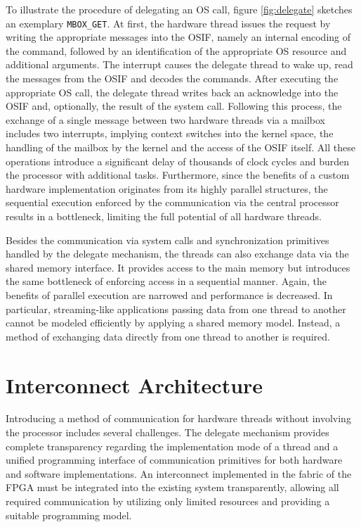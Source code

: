 To illustrate the procedure of delegating an \ac{OS} call, figure
\ref{fig:delegate} sketches an exemplary \lstinline{MBOX_GET}. At first, the
hardware thread issues the request by writing the appropriate messages into
the \ac{OSIF}, namely an internal encoding of the command, followed by an
identification of the appropriate \ac{OS} resource and additional arguments.
The interrupt causes the delegate thread to wake up, read the messages from
the \ac{OSIF} and decodes the commands. After executing the appropriate
\ac{OS} call, the delegate thread writes back an acknowledge into the
\ac{OSIF} and, optionally, the result of the system call. Following this
process, the exchange of a single message between two hardware threads via a
mailbox includes two interrupts, implying context switches into the kernel
space, the handling of the mailbox by the kernel and the access of the
\ac{OSIF} itself. All these operations introduce a significant delay of
thousands of clock cycles and burden the processor with additional tasks.
Furthermore, since the benefits of a custom hardware implementation originates
from its highly parallel structures, the sequential execution enforced by the
communication via the central processor results in a bottleneck, limiting the
full potential of all hardware threads.

Besides the communication via system calls and synchronization primitives
handled by the delegate mechanism, the threads can also exchange data via the
shared memory interface. It provides access to the main memory but introduces
the same bottleneck of enforcing access in a sequential manner. Again, the
benefits of parallel execution are narrowed and performance is decreased. In
particular, streaming-like applications passing data from one thread to
another cannot be modeled efficiently by applying a shared memory model.
Instead, a method of exchanging data directly from one thread to another is
required.

\section{Interconnect Architecture}

Introducing a method of communication for hardware threads without involving
the processor includes several challenges. The delegate mechanism provides
complete transparency regarding the implementation mode of a thread and a
unified programming interface of communication primitives for both hardware
and software implementations. An interconnect implemented in the fabric of the
\ac{FPGA} must be integrated into the existing system transparently, allowing
all required communication by utilizing only limited resources and providing a
suitable programming model.

